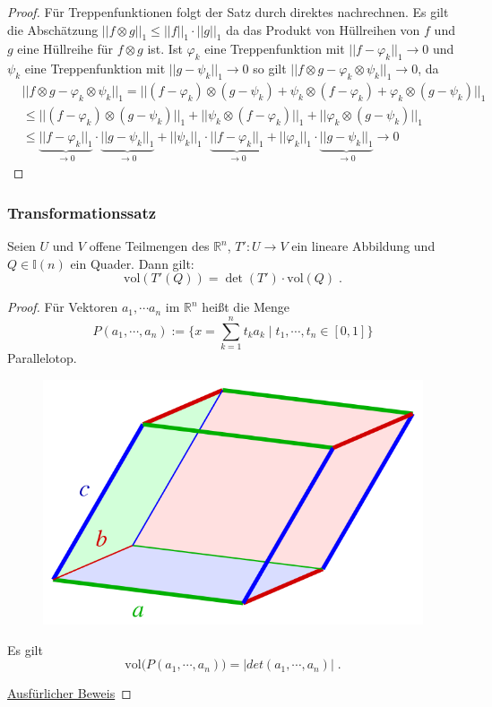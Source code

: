 \begin{proof}
Für Treppenfunktionen folgt der Satz durch direktes nachrechnen. Es gilt die Abschätzung $|| f \otimes g ||_1 \leq ||f ||_1 \cdot || g ||_1$  da das Produkt von  Hüllreihen von $f$ und $g$ eine Hüllreihe für $f \otimes g$ ist. Ist $\varphi_k$ eine Treppenfunktion mit $|| f - \varphi_k ||_1 \to 0$ und $\psi_k$ eine Treppenfunktion mit $|| g - \psi_k ||_1 \to 0$ so gilt $|| f \otimes g - \varphi_k \otimes \psi_k ||_1 \to 0$, da
\begin{align*}
& ||  f \otimes g - \varphi_k \otimes \psi_k  ||_1  = ||  (f - \varphi_k) \otimes (g - \psi_k)    + \psi_k \otimes (f  -  \varphi_k)  + \varphi_k \otimes (g - \psi_k)||_1 \\
& \leq  ||  (f - \varphi_k) \otimes (g - \psi_k)  ||_1  + || \psi_k \otimes (f -   \varphi_k) ||_1 + || \varphi_k \otimes (g -  \psi_k)||_1 \\
& \leq   \underbrace{||  f - \varphi_k ||_1}_{\to 0} \cdot   \underbrace{|| g - \psi_k  ||_1}_{\to 0} +  || \psi_k ||_1 \cdot   \underbrace{|| f -  \varphi_k ||_1}_{\to 0} + || \varphi_k ||_1 \cdot  \underbrace{|| g - \psi_k||_1}_{\to 0} \to 0
\end{align*}
\end{proof}


\subsubsection{Transformationssatz}




\begin{Satz}
Seien $U$ und $V$ offene Teilmengen des $\mathbb{R}^n$, $T': U \to V$ ein lineare Abbildung und  $Q \in \mathbb{I}(n)$ ein Quader.
Dann gilt:
 $$ \text{vol}  (T'(Q))   =  \det (T') \cdot   \text{vol}(Q) \; .$$
\end{Satz}
\begin{proof}
Für Vektoren $a_1, \cdots a_n$ im $\mathbb{R}^n$ heißt die Menge 
$$ P(a_1, \cdots,  a_n) := \biggl \{  x = \sum_{k=1}^n t_k a_k  \; | \; t_1, \cdots , t_n \in [0,1]  \biggr \}$$
Parallelotop.
\begin{figure}[H]
      \centering
    \includegraphics[width=0.6 \textwidth]{images/640px-Parallelepiped-0}    
\end{figure}
Es gilt  $$  \text{vol} \bigr( P(a_1, \cdots, a_n) \bigr) =  | det (a_1, \cdots, a_n) |   \; .$$

\href{https://www.math.uchicago.edu/~may/VIGRE/VIGRE2007/REUPapers/FINALAPP/Peng.pdf}{Ausfürlicher Beweis}

\end{proof}


